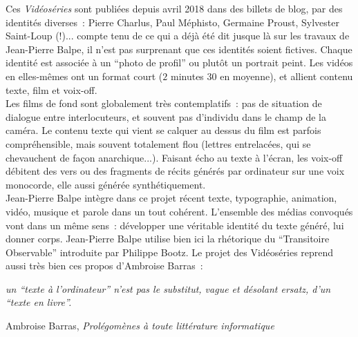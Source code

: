 \documentclass{article}
\newenvironment{citationbox}
{\begin{center}
		\begin{minipage}{.8\textwidth}
		}
		{
		\end{minipage}	
\end{center}
}
\begin{document}
				Ces  \textit{Vidéoséries} sont publiées depuis avril 2018 dans des billets de blog, par des identités diverses : Pierre Charlus, Paul Méphisto, Germaine Proust, Sylvester Saint-Loup (!)... compte tenu de ce qui a déjà été dit jusque là sur les travaux de Jean-Pierre Balpe, il n'est pas surprenant que ces identités soient fictives.    Chaque identité est associée à un ``photo de profil'' ou plutôt un portrait peint. Les vidéos en elles-mêmes ont un format court ($2$ minutes $30$ en moyenne), et allient contenu texte, film et voix-off.\\
				
				Les films de fond sont globalement très contemplatifs : pas de situation de dialogue entre interlocuteurs, et souvent pas d'individu dans le champ de la caméra. Le contenu texte qui vient se calquer au dessus du film est parfois compréhensible, mais souvent totalement flou (lettres entrelacées, qui se chevauchent de façon anarchique...). Faisant écho au texte à l'écran, les voix-off débitent des vers ou des fragments de récits générés par ordinateur sur une voix monocorde, elle aussi générée synthétiquement.\\
				
				Jean-Pierre Balpe intègre dans ce projet récent texte, typographie, animation, vidéo, musique et parole dans un tout cohérent. L'ensemble des médias convoqués vont dans un même sens~: développer une véritable identité du texte généré, lui donner corps. Jean-Pierre Balpe utilise bien ici la rhétorique du ``Transitoire Observable'' introduite par Philippe Bootz. Le projet des Vidéoséries reprend aussi très bien ces propos d'Ambroise Barras~:
				\begin{citationbox}
					\textit{un ``texte à
						l'ordinateur'' n'est pas le substitut, vague et désolant ersatz, d'un ``texte en
						livre''.}
					\begin{flushright}
						Ambroise Barras, \textit{Prolégomènes à toute littérature informatique} \cite{barras1995}
					\end{flushright}
				\end{citationbox}
				
\end{document}
